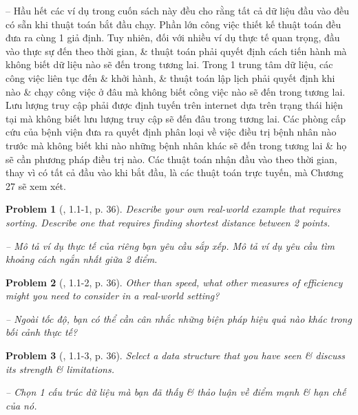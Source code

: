 \documentclass{article}
\newtheorem{problem}{Problem}
\begin{document}
\begin{itemize}
\begin{itemize}
\begin{itemize}
            -- Hầu hết các ví dụ trong cuốn sách này đều cho rằng tất cả dữ liệu đầu vào đều có sẵn khi thuật toán bắt đầu chạy. Phần lớn công việc thiết kế thuật toán đều đưa ra cùng 1 giả định. Tuy nhiên, đối với nhiều ví dụ thực tế quan trọng, đầu vào thực sự đến theo thời gian, \& thuật toán phải quyết định cách tiến hành mà không biết dữ liệu nào sẽ đến trong tương lai. Trong 1 trung tâm dữ liệu, các công việc liên tục đến \& khởi hành, \& thuật toán lập lịch phải quyết định khi nào \& chạy công việc ở đâu mà không biết công việc nào sẽ đến trong tương lai. Lưu lượng truy cập phải được định tuyến trên internet dựa trên trạng thái hiện tại mà không biết lưu lượng truy cập sẽ đến đâu trong tương lai. Các phòng cấp cứu của bệnh viện đưa ra quyết định phân loại về việc điều trị bệnh nhân nào trước mà không biết khi nào những bệnh nhân khác sẽ đến trong tương lai \& họ sẽ cần phương pháp điều trị nào. Các thuật toán nhận đầu vào theo thời gian, thay vì có tất cả đầu vào khi bắt đầu, là các thuật toán trực tuyến, mà Chương 27 sẽ xem xét.
            
            \begin{problem}[\cite{Cormen_Leiserson_Rivest_Stein_algorithm}, 1.1-1, p. 36]
                Describe your own real-world example that requires sorting. Describe one that requires finding shortest distance between 2 points.
                
                -- Mô tả ví dụ thực tế của riêng bạn yêu cầu sắp xếp. Mô tả ví dụ yêu cầu tìm khoảng cách ngắn nhất giữa 2 điểm.
            \end{problem}
            
            \begin{problem}[\cite{Cormen_Leiserson_Rivest_Stein_algorithm}, 1.1-2, p. 36]
                Other than speed, what other measures of efficiency might you need to consider in a real-world setting?
                
                -- Ngoài tốc độ, bạn có thể cần cân nhắc những biện pháp hiệu quả nào khác trong bối cảnh thực tế?
            \end{problem}
            
            \begin{problem}[\cite{Cormen_Leiserson_Rivest_Stein_algorithm}, 1.1-3, p. 36]
                Select a data structure that you have seen \& discuss its strength \& limitations.
                
                -- Chọn 1 cấu trúc dữ liệu mà bạn đã thấy \& thảo luận về điểm mạnh \& hạn chế của nó.
            \end{problem}
            

\end{itemize}
\end{itemize}
\end{itemize}
\end{document}
